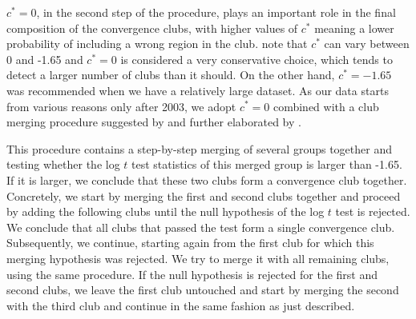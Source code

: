 \documentclass[11pt]{article}
\begin{document}
 \(c^{*} = 0\), in the second step of the procedure, plays an important role in the final composition of the convergence clubs, with higher values of $c^*$ meaning a lower probability of including a wrong region in the club. \citet{phillips2009economic} note that $c^{*}$ can vary between 0 and -1.65 and $c^{*}=0$ is considered a very conservative choice, which tends to detect a larger number of clubs than it should. On the other hand, $c^{*}=-1.65$ was recommended when we have a relatively large dataset. As our data starts from various reasons only after 2003, we adopt $c^*= 0$ combined with a club merging procedure suggested by \citet{phillips2009economic} and further elaborated by \citet{bartkowska2012regional}. 

This procedure contains a step-by-step merging of several groups together and testing whether the log $t$ test statistics of this merged group is larger than -1.65. If it is larger, we conclude that these two clubs form a convergence club together. Concretely, we start by merging the first and second clubs together and proceed by adding the following clubs until the null hypothesis of the log $t$ test is rejected. We conclude that all clubs that passed the test form a single convergence club. Subsequently, we continue, starting again from the first club for which this merging hypothesis was rejected. We try to merge it with all remaining clubs, using the same procedure. If the null hypothesis is rejected for the first and second clubs, we leave the first club untouched and start by merging the second with the third club and continue in the same fashion as just described.
\end{document}
